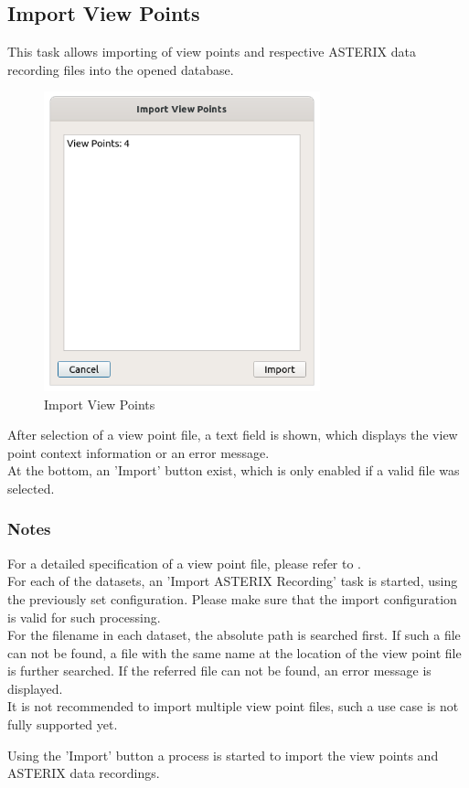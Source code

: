 \subsection{Import View Points}
\label{sec:ui_import_viewpoints}

This task allows importing of view points and respective ASTERIX data recording files into the opened database. \\

\begin{figure}[H]
  \center
    \includegraphics[width=8cm]{figures/view_point_import.png}
  \caption{Import View Points}
\end{figure}

After selection of a view point file, a text field is shown, which displays the view point context information or an error message. \\

At the bottom, an 'Import' button exist, which is only enabled if a valid file was selected.

\subsubsection{Notes}

For a detailed specification of a view point file, please refer to . \\

For each of the datasets, an 'Import ASTERIX Recording' task is started, using the previously set configuration. Please make sure that the import configuration is valid for such processing. \\

For the filename in each dataset, the absolute path is searched first. If such a file can not be found, a file with the same name at the location of the view point file is further searched. 
If the referred file can not be found, an error message is displayed. \\

It is not recommended to import multiple view point files, such a use case is not fully supported yet.

Using the 'Import' button a process is started to import the view points and ASTERIX data recordings. \\
